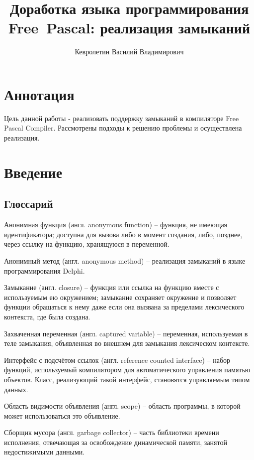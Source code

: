 \documentclass{imcs}
\title{Доработка языка программирования Free~Pascal: реализация замыканий}
\author{Кевролетин Василий Владимирович}
\begin{document}
\maketitle

\tableofcontents
\pagebreak

\section*{Аннотация}
Цель данной работы - реализовать поддержку замыканий в компиляторе Free Pascal Compiler.
Рассмотрены подходы к решению проблемы и осуществлена реализация.

\pagebreak

\section{Введение}
\subsection{Глоссарий}

Анонимная функция (англ. anonymous function) -- функция, не имеющая идентификатора; доступна для
вызова либо в момент создания, либо, позднее, через ссылку на функцию,
хранящуюся в переменной.

Анонимный метод (англ. anonymous method) -- реализация замыканий в языке программирования Delphi\cite{anonymmethods}. 

Замыкание (англ. closure) -- функция или ссылка на функцию вместе с используемым ею
окружением; замыкание сохраняет окружение и позволяет функции
обращаться к нему даже если она вызвана за пределами лексического
контекста, где была создана.

Захваченная переменная (англ. captured variable) -- переменная, используемая в теле замыкания,
объявленная во внешнем для замыкания лексическом контексте.

Интерфейс с подсчётом ссылок (англ. reference counted interface) -- набор функций, используемый компилятором для
автоматического управления памятью объектов. Класс, реализующий такой интерфейс,
становятся управляемым типом данных.

Область видимости объявления (англ. scope) -- область программы, в которой может 
использоваться это объявление.

Сборщик мусора (англ. garbage collector) -- часть библиотеки времени исполнения, отвечающая за освобождение
динамической памяти, занятой недостижимыми данными.
\end{document}
